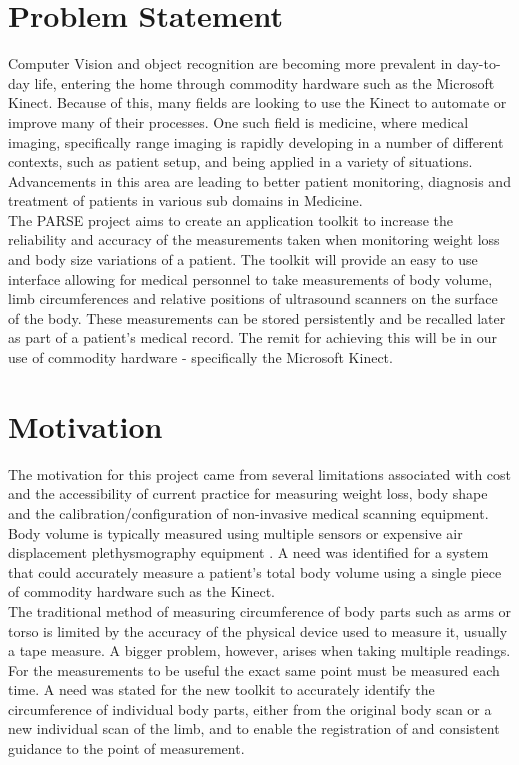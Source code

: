 \section{Problem Statement}
\label{spec: problem statement}
Computer Vision and object recognition are becoming more prevalent in day-to-day life, entering the home through commodity hardware such as the Microsoft Kinect. Because of this, many fields are looking to use the Kinect to automate or improve many of their processes. One such field is medicine, where medical imaging, specifically range imaging is rapidly developing in a number of different contexts, such as patient setup, and being applied in a variety of situations. Advancements in this area are leading to better patient monitoring, diagnosis and treatment of patients in various sub domains in Medicine.\\  

The PARSE project aims to create an application toolkit to increase the reliability and accuracy of the measurements taken when monitoring weight loss and body size variations of a patient. The toolkit will provide an easy to use interface allowing for medical personnel to take measurements of body volume, limb circumferences and relative positions of ultrasound scanners on the surface of the body. These measurements can be stored persistently and be recalled later as part of a patient’s medical record. The remit for achieving this will be in our use of commodity hardware - specifically the Microsoft Kinect.\\ 

\section{Motivation}
\label{spec:motivation}
The motivation for this project came from several limitations associated with cost and the accessibility of current practice for measuring weight loss, body shape and the calibration/configuration of non-invasive medical scanning equipment. Body volume is typically measured using multiple sensors \cite{Bauer2011} or expensive air displacement plethysmography equipment \cite{Izadi2011}. A need was identified for a system that could accurately measure a patient's total body volume using a single piece of commodity hardware such as the Kinect.\\ 

The traditional method of measuring circumference of body parts such as arms or torso is limited by the accuracy of the physical device used to measure it, usually a tape measure. A bigger problem, however, arises when taking multiple readings. For the measurements to be useful the exact same point must be measured each time. A need was stated for the new toolkit to accurately identify the circumference of individual body parts, either from the original body scan or a new individual scan of the limb, and to enable the registration of and consistent guidance to the point of measurement.\\ 

